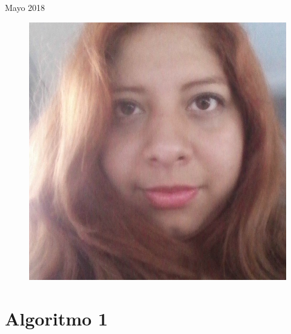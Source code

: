 \documentclass[12pt, fleqn]{article}                             %
\theoremstyle{break}                                            %
\begin{document}
\begin{titlepage}
    {\large \textsf{Mayo 2018}}                                  %

   
    \begin{figure}[H]
               \centering
                \includegraphics[scale=.2]{Laura.jpg}
            \end{figure}
\end{titlepage}


\restoregeometry                                                    %
\nopagecolor                                                        %




\tableofcontents{}
\label{sec:Index}

\clearpage
\section{Algoritmo 1}

\end{document}

